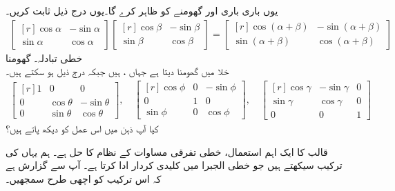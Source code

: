 یوں باری باری   اور  گھومنے کو  ظاہر کرے گا۔یوں درج ذیل ثابت کریں۔ 
\begin{align*}
\begin{bmatrix*}[r] \cos \alpha&-\sin \alpha\\ \sin \alpha & \cos \alpha \end{bmatrix*}\begin{bmatrix*}[r] \cos \beta&-\sin \beta\\ \sin \beta & \cos \beta \end{bmatrix*}=\begin{bmatrix*}[r] \cos (\alpha+\beta)&-\sin (\alpha+\beta)\\ \sin (\alpha+\beta) & \cos (\alpha+\beta) \end{bmatrix*}
\end{align*}
\quad خطی تبادلہ۔ گھومنا\\
خلا میں گھومنا  دیتا ہے جہاں ، 
  ہیں جبکہ  درج ذیل ہو سکتے ہیں۔
\begin{align*}
\begin{bmatrix*}[r] 1&0&0\\ 0& \cos \theta&-\sin \theta\\ 0&\sin \theta & \cos \theta \end{bmatrix*}, \quad \begin{bmatrix*}[r] \cos \phi& 0&-\sin \phi\\ 0&1&0\\ \sin \phi &0& \cos \phi \end{bmatrix*}, \quad \begin{bmatrix*}[r] \cos \gamma&-\sin \gamma&0\\ \sin \gamma & \cos \gamma &0\\0&0&1\end{bmatrix*}
\end{align*}
کیا آپ ذہن میں اس عمل کو دیکھ پاتے ہیں؟

قالب کا ایک اہم استعمال، خطی تفرقی مساوات کے نظام کا حل ہے۔ ہم یہاں  کی ترکیب سیکھتے ہیں جو خطی الجبرا میں کلیدی کردار ادا کرتا ہے۔ آپ سے گزارش ہے کہ اس ترکیب کو اچھی طرح سمجھیں۔

